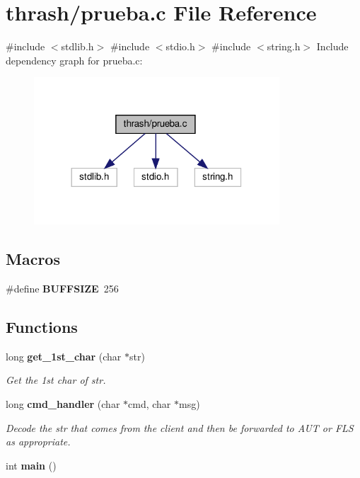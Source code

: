 \section{thrash/prueba.c File Reference}
\label{prueba_8c}
{\ttfamily \#include $<$stdlib.\+h$>$}\newline
{\ttfamily \#include $<$stdio.\+h$>$}\newline
{\ttfamily \#include $<$string.\+h$>$}\newline
Include dependency graph for prueba.\+c\+:\nopagebreak
\begin{figure}[H]
\begin{center}
\leavevmode
\includegraphics[width=260pt]{prueba_8c__incl}
\end{center}
\end{figure}
\subsection*{Macros}
\begin{DoxyCompactItemize}
\item 
\#define \textbf{ B\+U\+F\+F\+S\+I\+ZE}~256
\end{DoxyCompactItemize}
\subsection*{Functions}
\begin{DoxyCompactItemize}
\item 
long \textbf{ get\+\_\+1st\+\_\+char} (char $\ast$str)
\begin{DoxyCompactList}\small\item\em Get the 1st char of str. \end{DoxyCompactList}\item 
long \textbf{ cmd\+\_\+handler} (char $\ast$cmd, char $\ast$msg)
\begin{DoxyCompactList}\small\item\em Decode the str that comes from the client and then be forwarded to A\+UT or F\+LS as appropriate. \end{DoxyCompactList}\item 
int \textbf{ main} ()
\end{DoxyCompactItemize}


